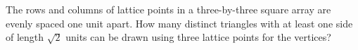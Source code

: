 The rows and columns of lattice points in a three-by-three square array are evenly spaced one unit apart. How many distinct triangles with at least one side of length $\sqrt2$ units can be drawn using three lattice points for the vertices?
